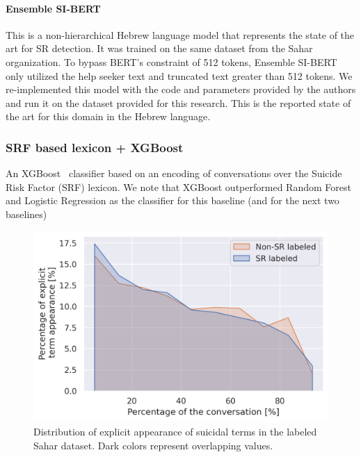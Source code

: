 \documentclass[letterpaper]{article} %
\begin{document}
 \paragraph{Ensemble SI-BERT~\cite{amir}} 
 This is a non-hierarchical Hebrew language model 
 that represents the state of the art for SR detection. It was trained on the same dataset from the Sahar organization.  To bypass BERT's constraint of 512 tokens, Ensemble SI-BERT only utilized the help seeker text and truncated text greater than 512 tokens. %
We re-implemented this model with the code and parameters provided by the authors and run it on the dataset provided for this research.  
 This is the reported state of the art for this domain in the Hebrew language.

 
\subsubsection{SRF based lexicon + XGBoost}
An XGBoost~\cite{chen2016xgboost} classifier based on  an encoding of conversations over the Suicide Risk Factor (SRF) lexicon. We note that XGBoost outperformed Random Forest and Logistic Regression as the classifier for this baseline (and for the next two baselines)
 
\begin{figure}[t]
\centering
\includegraphics[width=1.05\columnwidth]{figures/explicit_mention.jpg} 
\caption{Distribution of explicit appearance of suicidal terms in  the labeled Sahar dataset. Dark colors represent overlapping values.}
\label{fig:ExplictDis}
\end{figure}
\end{document}

